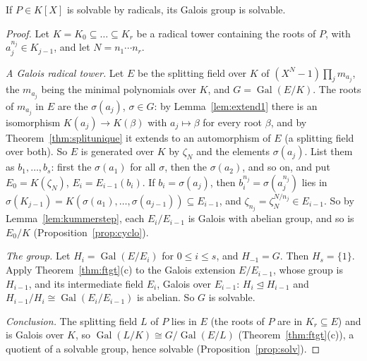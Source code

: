 \begin{theorem}[Galois]\label{thm:radsolv}
If $P\in K[X]$ is solvable by radicals, its Galois group is solvable.
\end{theorem}
\begin{proof}
Let $K=K_0\subseteq\dots\subseteq K_r$ be a radical tower containing the roots of $P$, with $a_j^{n_j}\in K_{j-1}$, and let $N=n_1\cdots n_r$.

\emph{A Galois radical tower.} Let $E$ be the splitting field over $K$ of $(X^N-1)\prod_jm_{a_j}$, the $m_{a_j}$ being the minimal polynomials over $K$, and $G=\operatorname{Gal}(E/K)$. The roots of $m_{a_j}$ in $E$ are the $\sigma(a_j)$, $\sigma\in G$: by Lemma~\ref{lem:extend1} there is an isomorphism $K(a_j)\to K(\beta)$ with $a_j\mapsto\beta$ for every root $\beta$, and by Theorem~\ref{thm:splitunique} it extends to an automorphism of $E$ (a splitting field over both). So $E$ is generated over $K$ by $\zeta_N$ and the elements $\sigma(a_j)$. List them as $b_1,\dots,b_s$: first the $\sigma(a_1)$ for all $\sigma$, then the $\sigma(a_2)$, and so on, and put $E_0=K(\zeta_N)$, $E_i=E_{i-1}(b_i)$. If $b_i=\sigma(a_j)$, then $b_i^{n_j}=\sigma(a_j^{n_j})$ lies in $\sigma(K_{j-1})=K(\sigma(a_1),\dots,\sigma(a_{j-1}))\subseteq E_{i-1}$, and $\zeta_{n_j}=\zeta_N^{N/n_j}\in E_{i-1}$. So by Lemma~\ref{lem:kummerstep}, each $E_i/E_{i-1}$ is Galois with abelian group, and so is $E_0/K$ (Proposition~\ref{prop:cyclo}).

\emph{The group.} Let $H_i=\operatorname{Gal}(E/E_i)$ for $0\le i\le s$, and $H_{-1}=G$. Then $H_s=\{1\}$. Apply Theorem~\ref{thm:ftgt}(c) to the Galois extension $E/E_{i-1}$, whose group is $H_{i-1}$, and its intermediate field $E_i$, Galois over $E_{i-1}$: $H_i\trianglelefteq H_{i-1}$ and $H_{i-1}/H_i\cong\operatorname{Gal}(E_i/E_{i-1})$ is abelian. So $G$ is solvable.

\emph{Conclusion.} The splitting field $L$ of $P$ lies in $E$ (the roots of $P$ are in $K_r\subseteq E$) and is Galois over $K$, so $\operatorname{Gal}(L/K)\cong G/\operatorname{Gal}(E/L)$ (Theorem~\ref{thm:ftgt}(c)), a quotient of a solvable group, hence solvable (Proposition~\ref{prop:solv}).
\end{proof}

